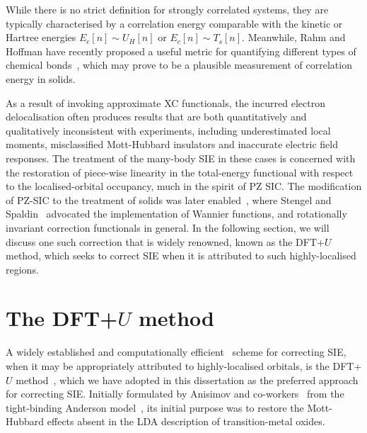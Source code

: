 {While there is no strict definition 
for strongly correlated systems, 
they are typically characterised  
by a correlation energy comparable 
with the kinetic or Hartree energies  
$E_c[n]\sim U_H[n]$ or $E_c[n]\sim T_s[n]$. 
%
{
Meanwhile, 
Rahm and Hoffman have 
recently proposed a useful metric for 
quantifying different types of chemical bonds~\cite{doi:10.1021/jacs.5b12434},
which may prove to be a plausible measurement  
of correlation energy in solids.}

As a result of invoking 
approximate XC functionals, 
the incurred electron delocalisation 
often produces results 
that are both quantitatively and qualitatively 
inconsistent with experiments, 
including
{underestimated} local moments, 
{misclassified} Mott-Hubbard insulators 
and inaccurate electric field responses.
%
The treatment of the many-body SIE 
in these cases
is concerned with the restoration 
of piece-wise linearity 
in the total-energy functional 
with respect to the localised-orbital occupancy, 
much in the spirit of PZ SIC.
%
{
The modification of PZ-SIC 
to the treatment of solids 
was later enabled~\cite{PhysRevB.37.9919,0295-5075-7-2-013,PhysRevLett.65.1148,PhysRevLett.68.1900,PhysRevB.47.4029,SZOTEK199119,PhysRevB.47.11533,PhysRevB.52.R14316,PhysRevLett.79.3970,PhysRevB.71.205109,0953-8984-21-4-045604}, 
where Stengel and Spaldin~\cite{PhysRevB.77.155106} 
advocated the implementation of Wannier functions, 
and rotationally invariant correction functionals 
in general.}
%
In the following section, 
we will discuss {one such correction 
that is widely renowned, 
known as the} DFT+$U$ method, 
which seeks to correct SIE 
when it is attributed to 
such highly-localised regions.

\section{The DFT+{$U$} method}
\label{sec:dft+u_method}

A widely established and 
computationally efficient~\cite{PhysRevB.85.085107} 
scheme for correcting SIE, 
when it may be appropriately 
attributed to highly-localised orbitals, 
is the DFT+$U$ 
method~\cite{PhysRevB.43.7570,PhysRevB.44.943,
PhysRevB.48.16929,PhysRevB.50.16861,PhysRevB.52.R5467,PhysRevB.57.1505,
PhysRevB.58.1201,PhysRevB.71.035105,QUA:QUA24521}, 
{which we have adopted in this dissertation   
as the preferred approach for correcting SIE}.
%
Initially formulated   
by Anisimov and co-workers~\cite{PhysRevB.43.7570,PhysRevB.44.943,PhysRevB.48.16929,PhysRevB.50.16861} 
from the tight-binding Anderson model~\cite{PhysRev.124.41}, 
its initial purpose was to restore  
the Mott-Hubbard effects 
absent in the LDA description of
transition-metal oxides.

}
